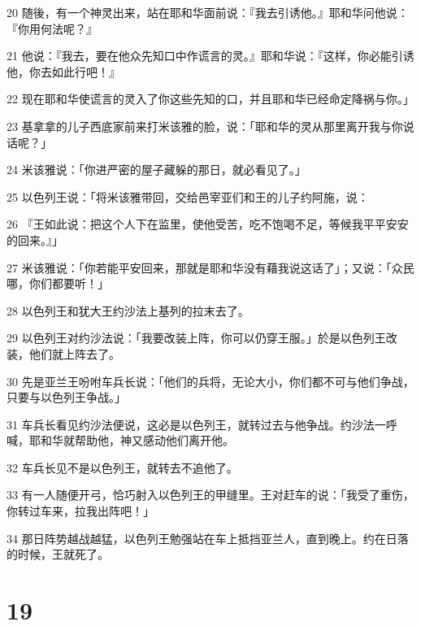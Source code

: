 \par 20 随後，有一个神灵出来，站在耶和华面前说：『我去引诱他。』耶和华问他说：『你用何法呢？』
\par 21 他说：『我去，要在他众先知口中作谎言的灵。』耶和华说：『这样，你必能引诱他，你去如此行吧！』
\par 22 现在耶和华使谎言的灵入了你这些先知的口，并且耶和华已经命定降祸与你。」
\par 23 基拿拿的儿子西底家前来打米该雅的脸，说：「耶和华的灵从那里离开我与你说话呢？」
\par 24 米该雅说：「你进严密的屋子藏躲的那日，就必看见了。」
\par 25 以色列王说：「将米该雅带回，交给邑宰亚们和王的儿子约阿施，说：
\par 26 『王如此说：把这个人下在监里，使他受苦，吃不饱喝不足，等候我平平安安的回来。』」
\par 27 米该雅说：「你若能平安回来，那就是耶和华没有藉我说这话了」；又说：「众民哪，你们都要听！」
\par 28 以色列王和犹大王约沙法上基列的拉末去了。
\par 29 以色列王对约沙法说：「我要改装上阵，你可以仍穿王服。」於是以色列王改装，他们就上阵去了。
\par 30 先是亚兰王吩咐车兵长说：「他们的兵将，无论大小，你们都不可与他们争战，只要与以色列王争战。」
\par 31 车兵长看见约沙法便说，这必是以色列王，就转过去与他争战。约沙法一呼喊，耶和华就帮助他，神又感动他们离开他。
\par 32 车兵长见不是以色列王，就转去不追他了。
\par 33 有一人随便开弓，恰巧射入以色列王的甲缝里。王对赶车的说：「我受了重伤，你转过车来，拉我出阵吧！」
\par 34 那日阵势越战越猛，以色列王勉强站在车上抵挡亚兰人，直到晚上。约在日落的时候，王就死了。

\chapter{19}

